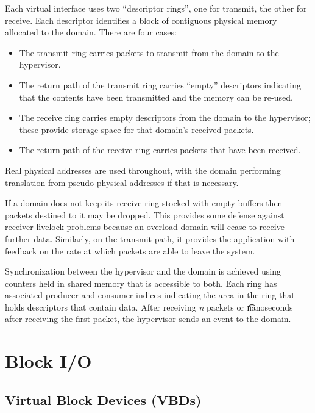 \documentclass[11pt,twoside,final,openright]{xenstyle}
\begin{document}
Each virtual interface uses two ``descriptor rings'', one for transmit,
the other for receive. Each descriptor identifies a block of contiguous
physical memory allocated to the domain. There are four cases:

\begin{itemize}

\item The transmit ring carries packets to transmit from the domain to the
hypervisor.

\item The return path of the transmit ring carries ``empty'' descriptors
indicating that the contents have been transmitted and the memory can be
re-used.

\item The receive ring carries empty descriptors from the domain to the 
hypervisor; these provide storage space for that domain's received packets.

\item The return path of the receive ring carries packets that have been
received.
\end{itemize}

Real physical addresses are used throughout, with the domain performing 
translation from pseudo-physical addresses if that is necessary.

If a domain does not keep its receive ring stocked with empty buffers then 
packets destined to it may be dropped. This provides some defense against 
receiver-livelock problems because an overload domain will cease to receive
further data. Similarly, on the transmit path, it provides the application
with feedback on the rate at which packets are able to leave the system.

Synchronization between the hypervisor and the domain is achieved using 
counters held in shared memory that is accessible to both. Each ring has
associated producer and consumer indices indicating the area in the ring
that holds descriptors that contain data. After receiving {\it n} packets
or {\t nanoseconds} after receiving the first packet, the hypervisor sends
an event to the domain. 

\chapter{Block I/O}

\section{Virtual Block Devices (VBDs)}
\end{document}
